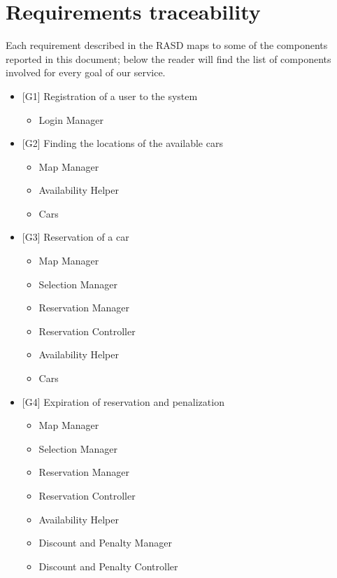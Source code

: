 \chapter{Requirements traceability}

Each requirement described in the RASD maps to some of the components reported in this document; below the reader will find the list of components involved for every goal of our service.

\begin{itemize}
	\item {[}G1{]} Registration of a user to the system
	\begin{itemize}
		\item Login Manager
	\end{itemize}

	\item {[}G2{]} Finding the locations of the available cars
	\begin{itemize}
		\item Map Manager
		\item Availability Helper
		\item Cars
	\end{itemize}

	\item {[}G3{]} Reservation of a car
	\begin{itemize}
		\item Map Manager
		\item Selection Manager
		\item Reservation Manager
		\item Reservation Controller
		\item Availability Helper
		\item Cars
	\end{itemize}

	\item {[}G4{]} Expiration of reservation and penalization
	\begin{itemize}
		\item Map Manager
		\item Selection Manager
		\item Reservation Manager
		\item Reservation Controller
		\item Availability Helper
		\item Discount and Penalty Manager
		\item Discount and Penalty Controller
	\end{itemize}


\end{itemize}
